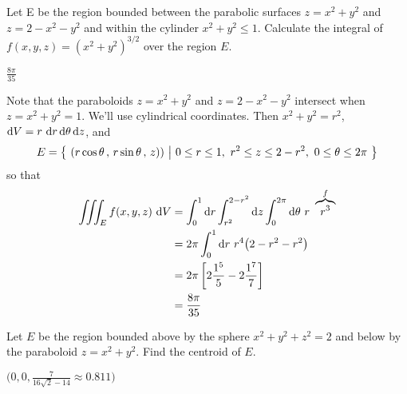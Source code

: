 \begin{question}[M200 2008A] %
Let E be the region bounded between the parabolic surfaces 
$z = x^2 + y^2$ and $z = 2 - x^2 - y^2$ and within the cylinder 
$x^2 + y^2 \le 1$.  Calculate the integral of $f(x,y,z) = {(x^2 + y^2)}^{3/2}$ over the region $E$.
\end{question}

%

\begin{answer}
$\frac{8\pi}{35}$
\end{answer}

\begin{solution}
Note that the paraboloids $z=x^2+y^2$ and $z=2-x^2-y^2$
intersect when $z=x^2+y^2=1$.
We'll use cylindrical coordinates. Then $x^2+y^2=r^2$, 
$\dee{V}=r \ \dee{r}\,\dee{\theta}\,\dee{z}$, and
\begin{equation*}
E=\Set{(r\cos\theta\,,\,r\sin\theta\,,\,z))}{0\le r\le 1,\ 
                    r^2\le z\le 2-r^2,\ 0\le\theta\le 2\pi}
\end{equation*}
so that
\begin{align*}
\tripInt_E f(x,y,z)\ \dee{V}
&=\int_0^1\dee{r}\int_{r^2}^{2-r^2}\dee{z}\int_0^{2\pi}\dee{\theta}\ 
        r\ \overbrace{r^3}^{f} \\
&=2\pi \int_0^1\dee{r}\ r^4\big(2-r^2-r^2\big) \\
&=2\pi \left[2\frac{1^5}{5}-2\frac{1^7}{7}\right] \\
&=\frac{8\pi}{35}
\end{align*}
\end{solution}

\begin{question}[M200 2010D] %
Let $E$ be the region bounded above by the sphere $x^2 + y^2 + z^2 = 2$ and below by the
paraboloid $z = x^2 + y^2$. Find the centroid of $E$.
\end{question}

%

\begin{answer}
$\big(0,0,\frac{7}{16\sqrt{2}-14}
  \approx 0.811\big)$
\end{answer}

